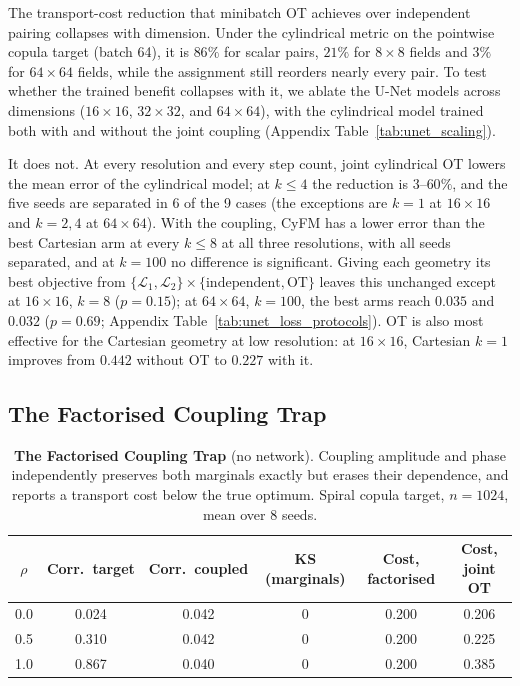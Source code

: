 The transport-cost reduction that minibatch OT achieves over independent pairing collapses with dimension. Under the cylindrical metric on the pointwise copula target (batch 64), it is $86\%$ for scalar pairs, $21\%$ for $8\times8$ fields and $3\%$ for $64\times64$ fields, while the assignment still reorders nearly every pair. To test whether the trained benefit collapses with it, we ablate the U-Net models across dimensions ($16\times16$, $32\times32$, and $64\times64$), with the cylindrical model trained both with and without the joint coupling (Appendix Table~\ref{tab:unet_scaling}).

It does not. At every resolution and every step count, joint cylindrical OT lowers the mean error of the cylindrical model; at $k \le 4$ the reduction is $3$--$60\%$, and the five seeds are separated in 6 of the 9 cases (the exceptions are $k=1$ at $16\times16$ and $k=2, 4$ at $64\times64$). With the coupling, CyFM has a lower error than the best Cartesian arm at every $k \le 8$ at all three resolutions, with all seeds separated, and at $k=100$ no difference is significant. Giving each geometry its best objective from $\{\mathcal{L}_1, \mathcal{L}_2\} \times \{\text{independent}, \text{OT}\}$ leaves this unchanged except at $16\times16$, $k=8$ ($p = 0.15$); at $64\times64$, $k=100$, the best arms reach $0.035$ and $0.032$ ($p = 0.69$; Appendix Table~\ref{tab:unet_loss_protocols}). OT is also most effective for the Cartesian geometry at low resolution: at $16\times16$, Cartesian $k=1$ improves from $0.442$ without OT to $0.227$ with it.

\subsection{The Factorised Coupling Trap}
\label{sec:exp_factorized}

\begin{table}[t]
    \centering
    \caption{\textbf{The Factorised Coupling Trap} (no network). Coupling amplitude and phase independently preserves both marginals exactly but erases their dependence, and reports a transport cost below the true optimum. Spiral copula target, $n = 1024$, mean over 8 seeds.}
    \label{tab:factorized}
    \vspace{1mm}
    \begin{tabular}{cccccc}
        \toprule
        $\rho$ & \textbf{Corr.\ target} & \textbf{Corr.\ coupled} & \textbf{KS (marginals)} & \textbf{Cost, factorised} & \textbf{Cost, joint OT} \\
        \midrule
        0.0 & 0.024 & 0.042 & 0 & 0.200 & 0.206 \\
        0.5 & 0.310 & 0.042 & 0 & 0.200 & 0.225 \\
        1.0 & 0.867 & 0.040 & 0 & 0.200 & 0.385 \\
        \bottomrule
    \end{tabular}
\end{table}

